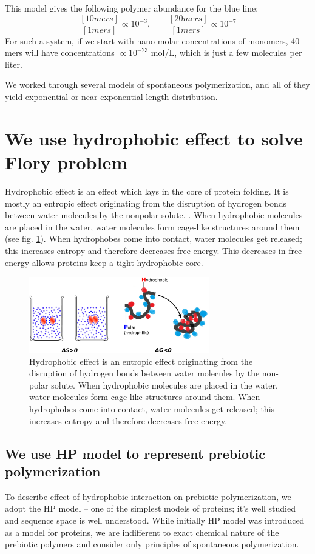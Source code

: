 \documentclass[12pt]{paper}
\newcommand{\pq}[1]{\left[ #1 \right]}
\begin{document}
This model gives the following 
polymer abundance for the blue line:
\begin{equation}
  \frac{\pq{10mers}}{\pq{1mers}}\propto10^{-3},\qquad\frac{\pq{20mers}}{\pq{1mers}}\propto10^{-7}
\end{equation} 
For such a system, if we start with nano-molar concentrations of monomers, 40-mers will have 
concentrations $\propto 10^{-23} $ mol/L, which is just a few molecules per liter. 

We worked through several models of spontaneous polymerization, and all of they yield exponential 
or near-exponential length distribution.

\section{We use hydrophobic effect to solve Flory problem}

Hydrophobic effect is an effect which lays in the core of protein folding. It is mostly an 
entropic effect originating from the disruption of hydrogen bonds between water 
molecules by the nonpolar solute. \cite{Silverstein1998}. When hydrophobic molecules are placed in 
the water, water molecules form cage-like structures around them (see fig. \ref{fig:hydro-effect}). 
When hydrophobes come into contact, water molecules get released; this increases entropy and 
therefore decreases free energy. This decreases in free energy allows proteins keep a tight 
hydrophobic core.
\begin{figure}[h!]
  \centering
  \includegraphics[width=0.7\textwidth]{pictures/hydrophobic-effect.pdf} 
  \caption{Hydrophobic effect is an entropic effect originating from the disruption of 
hydrogen bonds between water molecules by the non-polar solute.
When hydrophobic molecules are placed in the water, water molecules form cage-like 
structures around them. When hydrophobes come into contact, water 
molecules get released; this increases entropy and therefore decreases free energy. }
  \label{fig:hydro-effect}
\end{figure}

\subsection{We use HP model to represent prebiotic polymerization}
To describe effect of hydrophobic interaction on prebiotic polymerization, we adopt the HP model 
-- one of the simplest models of proteins; it's well studied and sequence space is well 
understood\cite{lau1989lattice,Chan1991,Miller1995,Yue1995,agarwala1997local}. While initially HP 
model was introduced as a model for proteins, we are indifferent to exact chemical nature of the 
prebiotic polymers and consider only principles of spontaneous polymerization.
\end{document}
